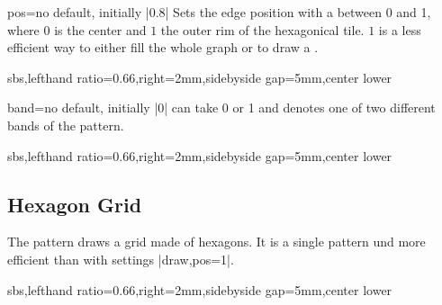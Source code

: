 \documentclass[a4paper,11pt]{article}
\begin{document}
\begin{myvoid}
\begin{docPatternKey}[][doc label=pos@hex]{pos}{=}{no default, initially |0.8|}
  Sets the edge position with a  between 0 and 1, where $0$ is
  the center and $1$ the outer rim of the hexagonical tile. $1$ is a less
  efficient way to either fill the whole graph or to draw a .

\begin{dispExample*}{sbs,lefthand ratio=0.66,right=2mm,sidebyside gap=5mm,center lower}
\end{dispExample*}
\end{docPatternKey}


\clearpage


\begin{docPatternKey}[][doc label=band@hex]{band}{=}{no default, initially |0|}
   can take 0 or 1 and denotes one of two different bands of the pattern.
\begin{dispExample*}{sbs,lefthand ratio=0.66,right=2mm,sidebyside gap=5mm,center lower}
\end{dispExample*}
\end{docPatternKey}



\clearpage
\subsection{Hexagon Grid}
The  pattern draws a grid made of hexagons. It is
a single pattern und more efficient than  with settings |draw,pos=1|.

\begin{dispExample*}{sbs,lefthand ratio=0.66,right=2mm,sidebyside gap=5mm,center lower}
\end{dispExample*}



\end{myvoid}
\end{document}
